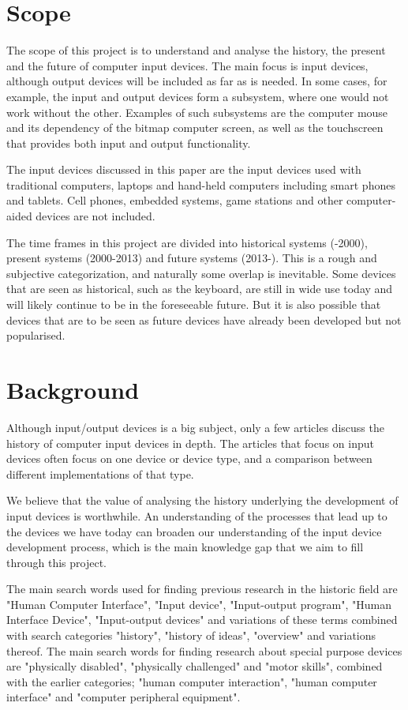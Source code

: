 \documentclass[a4paper,10pt]{article}
\begin{document}
\section{Scope}

The scope of this project is to understand and analyse the history, the present and the future of computer input devices. The main focus is input devices, although output devices will be included as far as is needed. In some cases, for example, the input and output devices form a subsystem, where one would not work without the other. Examples of such subsystems are the computer mouse and its dependency of the bitmap computer screen, as well as the touchscreen that provides both input and output functionality. 

The input devices discussed in this paper are the input devices used with traditional computers, laptops and hand-held computers including smart phones and tablets. Cell phones, embedded systems, game stations and other computer-aided devices are not included.

The time frames in this project are divided into historical systems (-2000), present systems (2000-2013) and future systems (2013-). This is a rough and subjective categorization, and naturally some overlap is inevitable. Some devices that are seen as historical, such as the keyboard, are still in wide use today and will likely continue to be in the foreseeable future. But it is also possible that devices that are to be seen as future devices have already been developed but not popularised.

\section{Background}
Although input/output devices is a big subject, only a few articles discuss the history of computer input devices in depth\cite{aspray}\cite{myers}.  The articles that focus on input devices often focus on one device or device type, and a comparison between different implementations of that type\cite{facial}\cite{azenkot}\cite{prescher}.

We believe that the value of analysing the history underlying the development of input devices is worthwhile. An understanding of the processes that lead up to the devices we have today can broaden our understanding of the input device development process, which is the main knowledge gap that we aim to fill through this project.

The main search words used for finding previous research in the historic field are "Human Computer Interface", "Input device", "Input-output program", "Human Interface Device", "Input-output devices" and variations of these terms combined with search categories "history", "history of ideas", "overview" and variations thereof. The main search words for finding research about special purpose devices are "physically disabled", "physically challenged" and "motor skills", combined with the earlier categories; "human computer interaction", "human computer interface" and "computer peripheral equipment".
\end{document}
